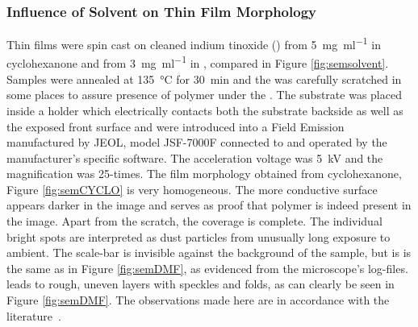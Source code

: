 \subsubsection{Influence of Solvent on Thin Film Morphology}
Thin films were spin cast on cleaned indium tinoxide (\ito{}) from \SI{5}{\milli\gram\per\milli\litre} \pvdf{} in cyclohexanone and from \SI{3}{\milli\gram\per\milli\litre} \pvdf{} in \dmf{}, compared in Figure \ref{fig:semsolvent}. Samples were annealed at \SI{135}{\degreeCelsius} for \SI{30}{\minute} and the \pvdf{} was carefully scratched in some places to assure presence of polymer under the \sem{}. The substrate was placed inside a holder which electrically contacts both the substrate backside as well as the exposed \pvdf{} front surface and were introduced into a Field Emission \sem{} manufactured by JEOL, model JSF-7000F connected to and operated by the manufacturer's specific software. The acceleration voltage was \SI{5}{\kilo\volt} and the magnification was 25-times. The film morphology obtained from cyclohexanone, Figure \ref{fig:semCYCLO} is very homogeneous. The more conductive \ito{} surface appears darker in the image and serves as proof that polymer is indeed present in the image. Apart from the scratch, the coverage is complete. The individual bright spots are interpreted as dust particles from unusually long exposure to ambient. The scale-bar is invisible against the background of the sample, but is is the same as in Figure \ref{fig:semDMF}, as evidenced from the microscope's log-files. \dmf{} leads to rough, uneven \pvdf{} layers with speckles and folds, as can clearly be seen in Figure \ref{fig:semDMF}. The observations made here are in accordance with the literature~\cite{naber_cyclo}.
